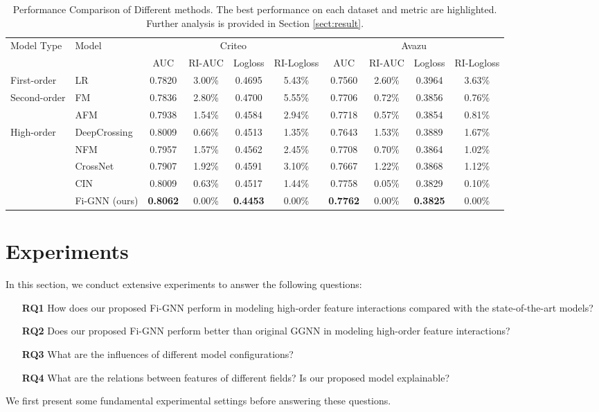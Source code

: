 \documentclass[sigconf]{acmart}
\begin{document}
 
\begin{table*}
\centering\caption{Performance Comparison of Different methods. The best performance on each dataset and metric are highlighted. Further analysis is provided in Section \ref{sect:result}.}
\begin{tabular}{llcccccccc} 
\hline
\multirow{2}{*}{Model Type} & \multirow{2}{*}{Model} & \multicolumn{4}{c}{Criteo} & \multicolumn{4}{c}{Avazu}\\
 &  & AUC & RI-AUC & Logloss & RI-Logloss & AUC & RI-AUC & Logloss & RI-Logloss \\
\hline
\multirow{1}{*}{First-order} & LR & 0.7820 & 3.00\% & 0.4695 & 5.43\% & 0.7560 & 2.60\% & 0.3964 & 3.63\% \\
 \hline
\multirow{2}{*}{Second-order} & FM~\cite{rendle2010factorization} & 0.7836 & 2.80\% & 0.4700 & 5.55\% & 0.7706 & 0.72\% & 0.3856 & 0.76\% \\ 
& AFM\cite{xiao2017attentional} & 0.7938 & 1.54\% & 0.4584 & 2.94\% & 0.7718 & 0.57\% & 0.3854 & 0.81\% \\
\midrule
\multirow{5}{*}{High-order} 
& DeepCrossing~\cite{shan2016deep} & 0.8009 & 0.66\% &0.4513 & 1.35\% & 0.7643 & 1.53\% & 0.3889 & 1.67\% \\
& NFM~\cite{he2017neural} & 0.7957 & 1.57\% & 0.4562 & 2.45\% & 0.7708 & 0.70\% & 0.3864 & 1.02\% \\
& CrossNet~\cite{wang2017deep} & 0.7907 & 1.92\% & 0.4591 & 3.10\% & 0.7667 & 1.22\% & 0.3868 & 1.12\% \\
& CIN~\cite{lian2018xdeepfm} & 0.8009 & 0.63\% & 0.4517 & 1.44\% & 0.7758 & 0.05\% & 0.3829 & 0.10\% \\
& Fi-GNN (ours)  & \textbf{0.8062} & 0.00\% & \textbf{0.4453} & 0.00\% & \textbf{0.7762} & 0.00\% & \textbf{0.3825} & 0.00\% \\
\bottomrule
\end{tabular}
\label{tab::results}
\end{table*}

\section{Experiments}
In this section, we conduct extensive experiments to answer the following questions:
\begin{itemize}
\item[\textbf{RQ1}]
 How does our proposed Fi-GNN perform in modeling high-order feature interactions compared with the state-of-the-art models?
\item[\textbf{RQ2}]
 Does our proposed Fi-GNN perform better than original GGNN in modeling high-order feature interactions?
\item[\textbf{RQ3}]
 What are the influences of different model configurations?
 \item[\textbf{RQ4}]
What are the relations between features of different fields? 
Is our proposed model explainable?
\end{itemize}
We first present some fundamental experimental settings before answering these questions.
\end{document}
